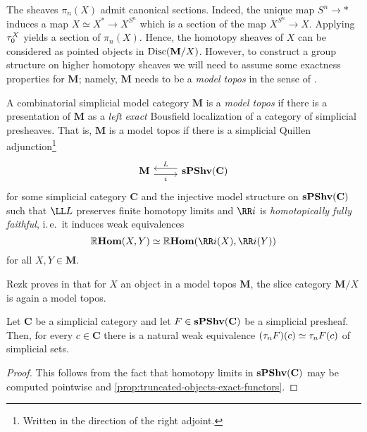 The sheaves \(\pi_{n}(X)\) admit canonical sections. Indeed, the unique map \(S^{n}\to *\) induces a map \(X\simeq X^{*}\to X^{S^{n}}\) which is a section of the map \(X^{S^{n}}\to X\). Applying \(\tau_{0}^{X}\) yields a section of \(\pi_{n}(X)\). Hence, the homotopy sheaves of \(X\) can be considered as pointed objects in \(\operatorname{\textnormal{Disc}}(\mathbf M/X)\). However, to construct a group structure on higher homotopy sheaves we will need to assume some exactness properties for \(\mathbf M\); namely, \(\mathbf M\) needs to be a \emph{model topos} in the sense of \cite{rezkhomotopytoposes}.

\begin{definition}\label{defn:model-topos}
  A combinatorial simplicial model category \(\mathbf M\) is a \emph{model topos} if there is a presentation of \(\mathbf M\) as a \emph{left exact} Bousfield localization of a category of simplicial presheaves. That is, \(\mathbf M\) is a model topos if there is a simplicial Quillen adjunction\footnote{Written in the direction of the right adjoint.}
\[
\begin{tikzcd}
  \mathbf M \arrow[r, shift right=.7ex, "i"'] & \arrow[l, shift right=.7ex, "L"'] \spshv(\mathbf C)
\end{tikzcd}
\]
for some simplicial category \(\mathbf C\) and the injective model structure on \(\operatorname{\textnormal{\bfseries sPShv}}(\mathbf C)\) such that \(\LL L\) preserves finite homotopy limits and \(\RR i\) is \emph{homotopically fully faithful}, i.\,e.~it induces weak equivalences
\[\RHom(X, Y)\simeq\RHom(\RR i(X), \RR i(Y))\]
for all \(X,Y\in\mathbf M\).
\end{definition}

Rezk proves in \cite[Corollary~6.10]{rezkhomotopytoposes} that for \(X\) an object in a model topos \(\mathbf M\), the slice category \(\mathbf M/X\) is again a model topos.

\begin{lemma}\label{lem:trunc-presheaves}
  Let \(\mathbf C\) be a simplicial category and let \(F\in\operatorname{\textnormal{\bfseries sPShv}}(\mathbf C)\) be a simplicial presheaf. Then, for every \(c\in\mathbf C\) there is a natural weak equivalence \((\tau_{n}F)(c)\simeq \tau_{n}F(c)\) of simplicial sets.
\end{lemma}
\begin{proof}
  This follows from the fact that homotopy limits in \(\operatorname{\textnormal{\bfseries sPShv}}(\mathbf C)\) may be computed pointwise and \autoref{prop:truncated-objects-exact-functors}.
\end{proof}

